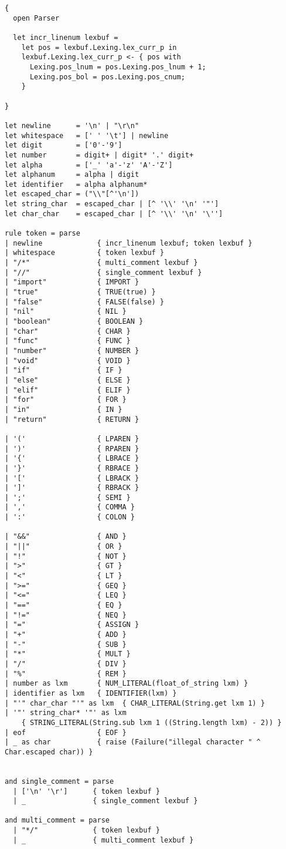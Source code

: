 \begin{verbatim}
{
  open Parser

  let incr_linenum lexbuf =
    let pos = lexbuf.Lexing.lex_curr_p in
    lexbuf.Lexing.lex_curr_p <- { pos with
      Lexing.pos_lnum = pos.Lexing.pos_lnum + 1;
      Lexing.pos_bol = pos.Lexing.pos_cnum;
    }

}

let newline      = '\n' | "\r\n"
let whitespace   = [' ' '\t'] | newline
let digit        = ['0'-'9']
let number       = digit+ | digit* '.' digit+
let alpha        = ['_' 'a'-'z' 'A'-'Z']
let alphanum     = alpha | digit
let identifier   = alpha alphanum*
let escaped_char = ("\\"[^'\n'])
let string_char  = escaped_char | [^ '\\' '\n' '"']
let char_char    = escaped_char | [^ '\\' '\n' '\'']

rule token = parse
| newline             { incr_linenum lexbuf; token lexbuf }
| whitespace          { token lexbuf }
| "/*"                { multi_comment lexbuf }
| "//"                { single_comment lexbuf }
| "import"            { IMPORT }
| "true"              { TRUE(true) }
| "false"             { FALSE(false) }
| "nil"               { NIL }
| "boolean"           { BOOLEAN }
| "char"              { CHAR }
| "func"              { FUNC }
| "number"            { NUMBER }
| "void"              { VOID }
| "if"                { IF }
| "else"              { ELSE }
| "elif"              { ELIF }
| "for"               { FOR }
| "in"                { IN }
| "return"            { RETURN }

| '('                 { LPAREN }
| ')'                 { RPAREN }
| '{'                 { LBRACE }
| '}'                 { RBRACE }
| '['                 { LBRACK }
| ']'                 { RBRACK }
| ';'                 { SEMI }
| ','                 { COMMA }
| ':'                 { COLON }

| "&&"                { AND }
| "||"                { OR }
| "!"                 { NOT }
| ">"                 { GT }
| "<"                 { LT }
| ">="                { GEQ }
| "<="                { LEQ }
| "=="                { EQ }
| "!="                { NEQ }
| "="                 { ASSIGN }
| "+"                 { ADD }
| "-"                 { SUB }
| "*"                 { MULT }
| "/"                 { DIV }
| "%"                 { REM }
| number as lxm       { NUM_LITERAL(float_of_string lxm) }
| identifier as lxm   { IDENTIFIER(lxm) }
| "'" char_char "'" as lxm  { CHAR_LITERAL(String.get lxm 1) }
| '"' string_char* '"' as lxm
    { STRING_LITERAL(String.sub lxm 1 ((String.length lxm) - 2)) }
| eof                 { EOF }
| _ as char           { raise (Failure("illegal character " ^ Char.escaped char)) }


and single_comment = parse
  | ['\n' '\r']      { token lexbuf }
  | _                { single_comment lexbuf }

and multi_comment = parse
  | "*/"             { token lexbuf }
  | _                { multi_comment lexbuf }
\end{verbatim}